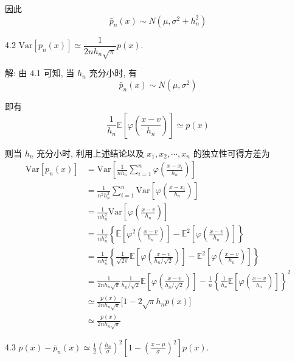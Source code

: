 \documentclass[openany]{ctexbook}
\theoremstyle{kaiti}
\theoremstyle{normal}
\begin{document}
因此
\begin{equation}
  \bar{p}_n(x)\sim N(\mu,\sigma^2+h_n^2)
\end{equation}

4.2 $\text{Var}[p_n(x)]\simeq\dfrac{1}{2nh_n\sqrt{\pi}}p(x)$.

解: 由 4.1 可知, 当 $h_n$ 充分小时, 有
\begin{equation}
  \bar{p}_n(x)\sim N(\mu,\sigma^2)
\end{equation}

即有
\begin{equation}
  \frac{1}{h_n}\mathbb{E}\left[\varphi\left(\frac{x-v}{h_{n}}\right)\right]\simeq p(x)
\end{equation}

则当 $h_n$ 充分小时, 利用上述结论以及 $x_1,x_2,\cdots,x_n$ 的独立性可得方差为
\begin{equation}
  \begin{aligned}
    \text{Var}[p_n(x)]
    &=\text{Var}\left[\frac{1}{nh_n}\sum_{i=1}^{n} \varphi\left(\frac{x-x_{i}}{h_{n}}\right)\right]\\
    &=\frac{1}{n^2h_n^2}\sum_{i=1}^{n}\text{Var} \left[\varphi\left(\frac{x-x_{i}}{h_{n}}\right)\right]\\
    &=\frac{1}{nh_n^2}\text{Var} \left[\varphi\left(\frac{x-v}{h_{n}}\right)\right]\\
    &=\frac{1}{nh_n^2}\left\{\mathbb{E}\left[\varphi^2\left(\frac{x-v}{h_{n}}\right)\right]-\mathbb{E}^2\left[\varphi\left(\frac{x-v}{h_{n}}\right)\right]\right\}\\
    &=\frac{1}{nh_n^2}\left\{\frac{1}{\sqrt{2\pi}}\mathbb{E}\left[\varphi\left(\frac{x-v}{h_{n}/\sqrt{2}}\right)\right]-\mathbb{E}^2\left[\varphi\left(\frac{x-v}{h_{n}}\right)\right]\right\}\\
    &=\frac{1}{2nh_n\sqrt{\pi}}\frac{1}{h_n/\sqrt{2}}\mathbb{E}\left[\varphi\left(\frac{x-v}{h_{n}/\sqrt{2}}\right)\right]-\frac{1}{n}\left\{\frac{1}{h_n}\mathbb{E}\left[\varphi\left(\frac{x-v}{h_{n}}\right)\right]\right\}^2\\
    &\simeq\frac{p(x)}{2nh_n\sqrt{\pi}}\Big[1-2\sqrt{\pi}h_np(x)\Big]\\
    &\simeq\frac{p(x)}{2nh_n\sqrt{\pi}}
  \end{aligned}
\end{equation}

4.3 $\displaystyle p(x)-\bar{p}_{n}(x) \simeq \frac{1}{2}\left(\frac{h_{n}}{\sigma}\right)^{2}\left[1-\left(\frac{x-\mu}{\sigma}\right)^{2}\right] p(x)$.
\end{document}

